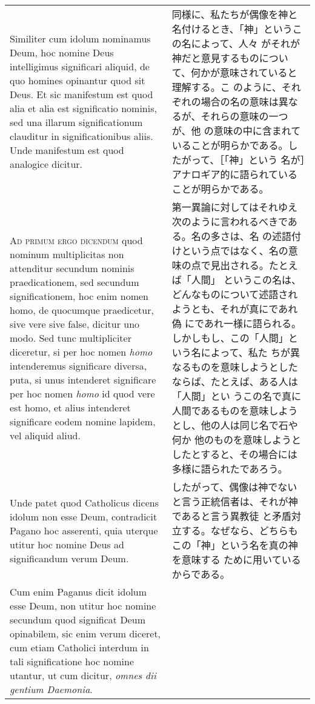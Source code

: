 \documentclass[paper=a4paper,fontsize=10pt,jafontsize=9pt,titlepage]{jlreq}
\begin{document}
\begin{longtable}{p{21em}p{21em}}
Similiter cum idolum nominamus Deum, hoc nomine Deus intelligimus
significari aliquid, de quo homines opinantur quod sit Deus. Et sic
manifestum est quod alia et alia est significatio nominis, sed una
illarum significationum clauditur in significationibus aliis. Unde
manifestum est quod analogice dicitur.

&

同様に、私たちが偶像を神と名付けるとき、「神」というこの名によって、人々
がそれが神だと意見するものについて、何かが意味されていると理解する。こ
のように、それぞれの場合の名の意味は異なるが、それらの意味の一つが、他
の意味の中に含まれていることが明らかである。したがって、［「神」という
名が］アナロギア的に語られていることが明らかである。

\\

{\scshape Ad primum ergo dicendum} quod nominum multiplicitas non
attenditur secundum nominis praedicationem, sed secundum
significationem, hoc enim nomen homo, de quocumque praedicetur, sive
vere sive false, dicitur uno modo. Sed tunc multipliciter diceretur,
si per hoc nomen {\itshape homo} intenderemus significare diversa,
puta, si unus intenderet significare per hoc nomen {\itshape homo} id
quod vere est homo, et alius intenderet significare eodem nomine
lapidem, vel aliquid aliud.

&

第一異論に対してはそれゆえ次のように言われるべきである。名の多さは、名
の述語付けという点ではなく、名の意味の点で見出される。たとえば「人間」
というこの名は、どんなものについて述語されようとも、それが真にであれ偽
にであれ一様に語られる。しかしもし、この「人間」という名によって、私た
ちが異なるものを意味しようとしたならば、たとえば、ある人は「人間」とい
うこの名で真に人間であるものを意味しようとし、他の人は同じ名で石や何か
他のものを意味しようとしたとすると、その場合には多様に語られたであろう。

\\

Unde patet quod Catholicus dicens idolum non esse Deum, contradicit
Pagano hoc asserenti, quia uterque utitur hoc nomine Deus ad
significandum verum Deum.

&

したがって、偶像は神でないと言う正統信者は、それが神であると言う異教徒
と矛盾対立する。なぜなら、どちらもこの「神」という名を真の神を意味する
ために用いているからである。

\\

Cum enim Paganus dicit idolum esse Deum, non utitur hoc nomine
secundum quod significat Deum opinabilem, sic enim verum diceret, cum
etiam Catholici interdum in tali significatione hoc nomine utantur, ut
cum dicitur, {\itshape omnes dii gentium Daemonia}.


\end{longtable}
\end{document}
